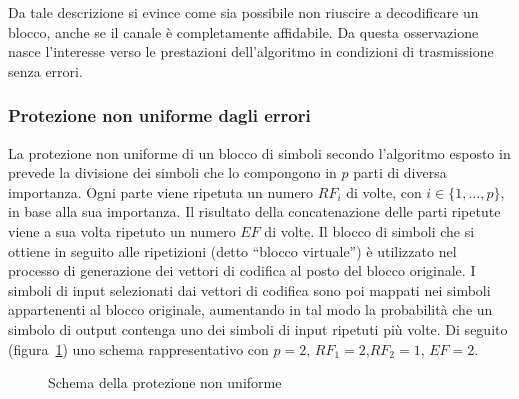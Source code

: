 \documentclass[italian, a4paper, 12pt]{article}
\begin{document}
Da tale descrizione si evince come sia possibile non riuscire a decodificare un blocco, anche se il canale è completamente affidabile. Da questa osservazione nasce l'interesse verso le prestazioni dell'algoritmo in condizioni di trasmissione senza errori.

\subsubsection{Protezione non uniforme dagli errori}\label{UEPsection}
La protezione non uniforme di un blocco di simboli secondo l'algoritmo esposto in \cite{uep} prevede la divisione dei simboli che lo compongono in $p$ parti di diversa importanza.
Ogni parte viene ripetuta un numero $RF_i$ di volte, con $i\in\{1,\dots,p\}$, in base alla sua importanza.
Il risultato della concatenazione delle parti ripetute viene a sua volta ripetuto un numero $EF$ di volte.
%
Il blocco di simboli che si ottiene in seguito alle ripetizioni (detto ``blocco virtuale'') è utilizzato nel processo di generazione dei vettori di codifica al posto del blocco originale.
%
I simboli di input selezionati dai vettori di codifica sono poi mappati nei simboli appartenenti al blocco originale, aumentando in tal modo la probabilità che un simbolo di output contenga uno dei simboli di input ripetuti più volte.
%
Di seguito (figura~\ref{fig:UEP}) uno schema rappresentativo con $p=2$, $RF_1 = 2$,$RF_2=1$, $EF=2$.
\begin{figure}[htb]
    \centering
    \caption{Schema della protezione non uniforme}
    \label{fig:UEP}
\end{figure}
\end{document}
